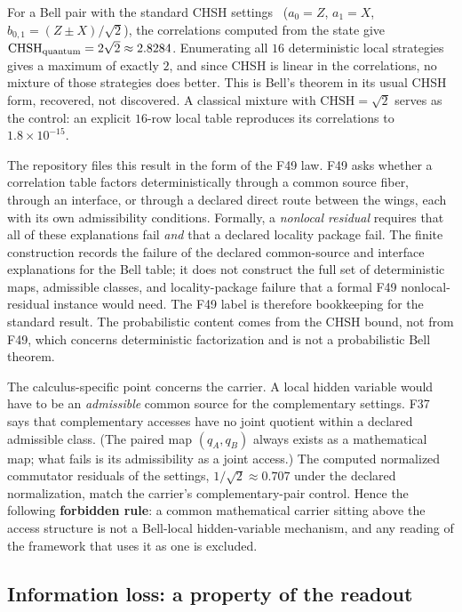 \documentclass[11pt]{article}
\theoremstyle{definition}
\begin{document}
For a Bell pair with the standard CHSH settings~\citep{Bell1964,CHSH1969} (\(a_0=Z\), \(a_1=X\),
\(b_{0,1}=(Z\pm X)/\sqrt2\)), the correlations computed from the state give
\(\mathrm{CHSH}_{\rm quantum}=2\sqrt2\approx2.8284\). Enumerating all \(16\) deterministic local strategies gives a
maximum of exactly \(2\), and since CHSH is linear in the correlations, no mixture of those strategies does better. This
is Bell's theorem in its usual CHSH form, recovered, not discovered. A classical mixture with
\(\mathrm{CHSH}=\sqrt2\) serves as the control: an explicit \(16\)-row local table reproduces its correlations to
\(1.8\times10^{-15}\).

The repository files this result in the form of the F49 law. F49 asks whether a correlation table factors
deterministically through a common source fiber, through an interface, or through a declared direct route between the
wings, each with its own admissibility conditions. Formally, a \emph{nonlocal residual} requires that all of these
explanations fail \emph{and} that a declared locality package fail. The finite construction records the failure of
the declared common-source and interface explanations for the Bell table; it does not construct the full set of
deterministic maps, admissible classes, and locality-package failure that a formal F49 nonlocal-residual instance
would need. The F49 label is therefore bookkeeping for the standard result. The probabilistic content comes from the
CHSH bound, not from F49, which concerns deterministic factorization and is not a probabilistic Bell theorem.

The calculus-specific point concerns the carrier. A local hidden variable would have to be an \emph{admissible} common
source for the complementary settings. F37 says that complementary accesses have no joint quotient within a declared
admissible class. (The paired map \((q_A,q_B)\) always exists as a mathematical map; what fails is its admissibility
as a joint access.) The computed normalized commutator residuals of the settings, \(1/\sqrt2\approx0.707\) under the declared
normalization, match the carrier's complementary-pair control. Hence
the following \textbf{forbidden rule}: a common mathematical carrier sitting above the access structure is not a
Bell-local hidden-variable mechanism, and any reading of the framework that uses it as one is excluded.

\subsection{Information loss: a property of the readout}\label{black-hole-information-loss-is-a-property-of-the-readout-not-the-carrier}
\end{document}
